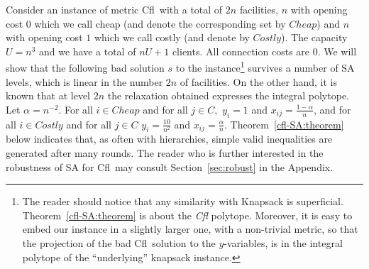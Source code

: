 \documentclass[11pt]{article}
\newcommand{\cfl}{{\sc Cfl}}
\begin{document}
Consider an  instance of metric  \cfl\ with a  total of
$2n$ facilities,  $n$ with opening cost  $0$ which we  call cheap (and
denote the corresponding set by $Cheap$) and $n$ with opening cost $1$
which   we  call  costly   (and  denote   by
$Costly$).  The  capacity  $U=n^3$  and  we have  a  total  of  $nU+1$
clients. All connection costs are $0$. We will show that the following
bad solution  $s$ to the instance\footnote{The reader should notice
  that any similarity with Knapsack is
  superficial. Theorem~\ref{cfl-SA:theorem} is about the {\em \cfl}
    polytope. Moreover, it is easy to embed our instance 
 in a slightly larger one, with a non-trivial metric,  so that 
the projection of the bad \cfl\ solution
to the $y$-variables, is in the integral polytope of the ``underlying''
     knapsack  instance.
}
  survives a  number of SA levels, which is  linear 
in the number $2n$ of facilities. On the other hand, it
is known that 
at level $2n$ the  relaxation obtained expresses the integral polytope.
Let  $\alpha=n^{-2}$.  For all  $i\in  Cheap$  and  for all  $j\in  C,$
$y_{i}=1$ and  $x_{ij}=\frac{1-\alpha}{n}$, and for  all $i\in Costly$
and     for     all     $j\in    C$     $y_{i}=\frac{10}{n^2}$     and
$x_{ij}=\frac{\alpha}{n}$. Theorem~\ref{cfl-SA:theorem} below
indicates that, as often with hierarchies,  simple valid inequalities are
generated after many rounds.  The reader who is further interested in
the robustness of SA for \cfl\ may consult Section~\ref{sec:robust} in
the Appendix. 
\end{document}

